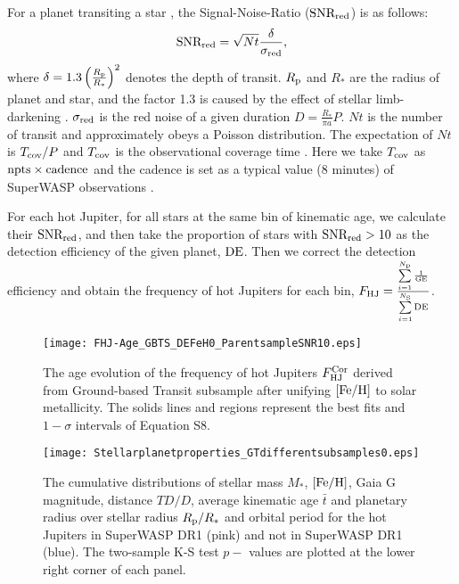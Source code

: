 \documentclass[twocolumn]{pnas-new}
\begin{document}
\begin{enumerate}
  
  For a planet transiting a star , the Signal-Noise-Ratio ($\rm SNR_{red}$) is as follows:
  \begin{equation}
    {\rm SNR_{red}} = \sqrt{Nt} \frac{\delta}{\sigma_{\rm red}},
  \end{equation}
  where $\delta = 1.3 \left(\frac{R_{\rm p}}{R_*} \right)^2$ denotes the depth of transit.
  $R_{\rm p}$ and $R_*$ are the radius of planet and star, and the factor 1.3 is caused by the effect of stellar limb-darkening \citep{2005ApJ...627.1011T}.
  $\sigma_{\rm red}$ is the red noise of a given duration $D = \frac{R_*}{\pi a} P$.
  $Nt$ is the number of transit and approximately obeys a Poisson distribution. 
  The expectation of $Nt$ is $T_{\rm cov}/P$ and $T_{\rm cov}$ is the observational coverage time \citep{2004PASP..116..985D}.
  Here we take $T_{\rm cov}$ as $\rm npts \times cadence$ and the cadence is set as a typical value (8 minutes) of SuperWASP observations \citep[e.g.,][]{2006MNRAS.373.1151S,2006MNRAS.372.1117C}.

  

   
  For each hot Jupiter, for all stars at the same bin of kinematic age, we calculate their $\rm SNR_{red}$, and then take the proportion of stars with $\rm SNR_{red}>10$ \citep{2006MNRAS.373.1151S} as the detection efficiency of the given planet, $\rm DE$.
  Then we correct the detection efficiency and obtain the frequency of hot Jupiters for each bin, $F_{\rm HJ} = \frac{\sum\limits_{i=1}^{N_{\rm p}}{\frac{1}{\rm GE}}}{\sum\limits_{i=1}^{N_{\rm S}} \rm DE}$. 
   
\end{enumerate}


\begin{figure}[!t]
\centering
\texttt{[image: FHJ-Age\_GBTS\_DEFeH0\_ParentsampleSNR10.eps]}
\caption{The age evolution of the frequency of hot Jupiters $F^{\rm Cor}_{\rm HJ}$  derived from Ground-based Transit subsample after unifying $\rm [Fe/H]$ to solar metallicity.
The solids lines and regions represent the best fits and $1-\sigma$ intervals of Equation S8.
\label{figGBTSOccurrencerateDEFeH}}
\end{figure}

\begin{figure}[!t]
\centering
\texttt{[image: Stellarplanetproperties\_GTdifferentsubsamples0.eps]}
\caption{The cumulative distributions of stellar mass $M_*$, $\rm [Fe/H]$, Gaia G magnitude, distance $TD/D$, average kinematic age $\bar{t}$ and planetary radius over stellar radius $R_{\rm p}/R_*$ and orbital period for the hot Jupiters in SuperWASP DR1 (pink) and not in SuperWASP DR1 (blue).
The two-sample K-S test $p-$ values are plotted at the lower right corner of each panel.
\label{figGTSuperWASPProperties}}
\end{figure}
\end{document}
